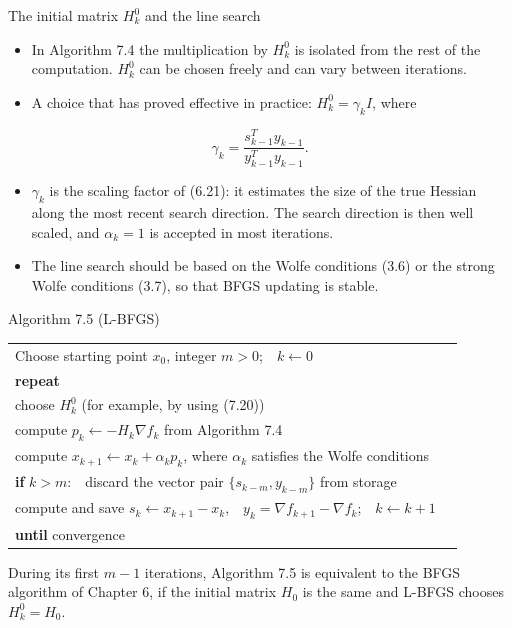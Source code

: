 \documentclass[aspectratio=169,12pt]{beamer}
\makeatletter
\newcommand{\gradf}{\nabla f}
\newcommand{\la}{\leftarrow}
\newenvironment{algo}{\par\renewcommand{\arraystretch}{1.12}%
  \begin{tabular}{@{}l@{\hspace{2.2em}}l@{}}}{\end{tabular}\par}
\makeatother
\begin{document}
\begin{frame}{The initial matrix $H_{k}^{0}$ and the line search}
  \begin{itemize}\setlength\itemsep{0.5em}
    \item In Algorithm 7.4 the multiplication by $H_{k}^{0}$ is isolated from the rest of the
      computation. $H_{k}^{0}$ can be chosen freely and can vary between iterations.
    \item A choice that has proved effective in practice: $H_{k}^{0}=\gamma_{k}I$, where
  \end{itemize}
  \[ \gamma_{k}=\frac{s_{k-1}^{T}y_{k-1}}{y_{k-1}^{T}y_{k-1}} . \tag{7.20} \]
  \begin{itemize}\setlength\itemsep{0.5em}
    \item $\gamma_{k}$ is the scaling factor of (6.21): it estimates the size of the true Hessian
      along the most recent search direction. The search direction is then well scaled,
      and $\alpha_{k}=1$ is accepted in most iterations.
    \item The line search should be based on the Wolfe conditions (3.6) or the strong
      Wolfe conditions (3.7), so that BFGS updating is stable.
  \end{itemize}
\end{frame}

\begin{frame}{Algorithm 7.5 (L-BFGS)}
  \begin{block}{}
    \begin{algo}
      Choose starting point $x_{0}$, integer $m>0$;\ \ $k\la 0$ & \\
      \textbf{repeat} & \\
      \qquad choose $H_{k}^{0}$ (for example, by using (7.20)) & \\
      \qquad compute $p_{k}\la-H_{k}\gradf_{k}$ from Algorithm 7.4 & \\
      \qquad compute $x_{k+1}\la x_{k}+\alpha_{k}p_{k}$, where $\alpha_{k}$ satisfies the Wolfe conditions & \\
      \qquad \textbf{if} $k>m$:\ \ discard the vector pair $\{s_{k-m},y_{k-m}\}$ from storage & \\
      \qquad compute and save $s_{k}\la x_{k+1}-x_{k}$,\ \ $y_{k}=\gradf_{k+1}-\gradf_{k}$;\ \ $k\la k+1$ & \\
      \textbf{until} convergence & \\
    \end{algo}
  \end{block}

  During its first $m-1$ iterations, Algorithm 7.5 is equivalent to the BFGS algorithm of
  Chapter 6, if the initial matrix $H_{0}$ is the same and L-BFGS chooses $H_{k}^{0}=H_{0}$.
\end{frame}
\end{document}
